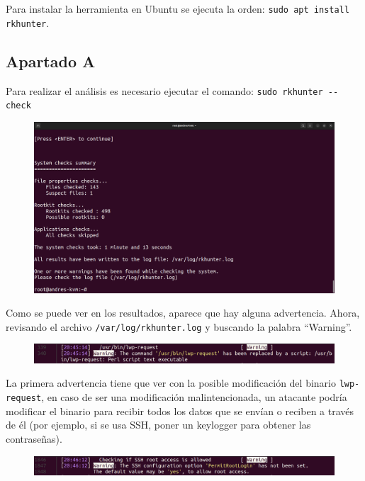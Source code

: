 \documentclass{article}
\begin{document}
Para instalar la herramienta en Ubuntu se ejecuta la orden: \verb|sudo apt install rkhunter|.

\subsection*{Apartado A}
Para realizar el análisis es necesario ejecutar el comando: \verb|sudo rkhunter --check|

\begin{figure}[H]
    \includegraphics[width=\textwidth]{imagenes/rkhuntersalida1.png}
\end{figure}

Como se puede ver en los resultados, aparece que hay alguna advertencia. Ahora, revisando el archivo \verb|/var/log/rkhunter.log| y buscando la palabra ``Warning''.

\begin{figure}[H]
    \includegraphics[width=\textwidth]{imagenes/warn1.png}
\end{figure}

La primera advertencia tiene que ver con la posible modificación del binario \verb|lwp-request|, en caso de ser una modificación malintencionada, un atacante podría modificar el binario para recibir todos los datos que se envían o reciben a través de él (por ejemplo, si se usa SSH, poner un keylogger para obtener las contraseñas).

\begin{figure}[H]
    \includegraphics[width=\textwidth]{imagenes/warn2.png}
\end{figure}
\end{document}
